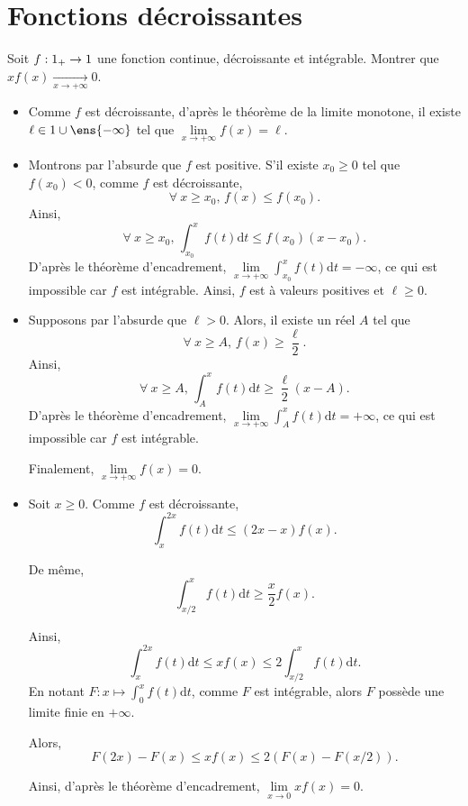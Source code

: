\section{Fonctions décroissantes}

\begin{exercice}
    Soit $f : 1_+ \to 1$ une fonction continue, décroissante et intégrable. Montrer que $x f(x) \xrightarrow[x \to +\infty]{} 0$.
\end{exercice}



\begin{elem_sol}
\begin{itemize}
\item Comme $f$ est décroissante, d'après le théorème de la limite monotone, il existe $\ell \in \R \cup \ens{-\infty}$ tel que $\lim\limits_{x\to+\infty} f(x) = \ell$.

\item Montrons par l'absurde que $f$ est positive. S'il existe $x_0 \geq 0$ tel que $f(x_0) < 0$, comme $f$ est décroissante,
\[
\forall\ x \geq x_0,\, f(x) \leq f(x_0).
\]
Ainsi,
\[
\forall\ x \geq x_0,\, \displaystyle\int_{x_0}^x f(t) \mathrm{d}t \leq f(x_0) (x - x_0).
\]
D'après le théorème d'encadrement, $\lim\limits_{x\to+\infty} \displaystyle\int_{x_0}^x f(t) \mathrm{d}t = -\infty$, ce qui est impossible car $f$ est intégrable. Ainsi, $f$ est à valeurs positives et $\ell \geq 0$.

\item Supposons par l'absurde que $\ell > 0$. Alors, il existe un réel $A$ tel que
\[
\forall\ x \geq A,\, f(x) \geq \frac{\ell}{2}.
\]
Ainsi,
\[
\forall\ x \geq A,\, \displaystyle\int_A^x f(t) \mathrm{d}t \geq \frac{\ell}{2} (x - A).
\]
D'après le théorème d'encadrement, $\lim\limits_{x\to+\infty} \displaystyle\int_A^x f(t) \mathrm{d}t = +\infty$, ce qui est impossible car $f$ est intégrable.

Finalement, $\lim\limits_{x\to+\infty} f(x) = 0$.

\item Soit $x \geq 0$. Comme $f$ est décroissante,
\[
\displaystyle\int_x^{2 x} f(t) \mathrm{d}t \leq (2 x - x) f(x).
\]

De même,
\[
\displaystyle\int_{x/2}^x f(t) \mathrm{d}t \geq \frac{x}{2} f(x).
\]

Ainsi,
\[
\displaystyle\int_x^{2 x} f(t) \mathrm{d}t \leq x f(x) \leq 2 \displaystyle\int_{x/2}^x f(t) \mathrm{d}t.
\]
En notant $F : x \mapsto \displaystyle\int_0^x f(t) \mathrm{d}t$, comme $F$ est intégrable, alors $F$ possède une limite finie en $+\infty$.

Alors,
\[
F(2 x) - F(x) \leq x f(x) \leq 2 (F(x) - F(x/2)).
\]

Ainsi, d'après le théorème d'encadrement, $\lim\limits_{x\to 0} x f(x) = 0$.
\end{itemize}
\end{elem_sol}


